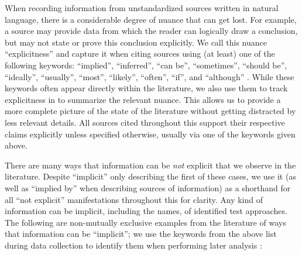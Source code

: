 When recording information from unstandardized sources written in natural
language, there is a considerable degree of nuance that can get lost. For
example, a source may provide data from which the reader can logically draw a
conclusion, but may not state or prove this conclusion explicitly.
We call this nuance ``explicitness'' and capture it when citing sources using
(at least) one of the following keywords: ``implied'', ``inferred'',
``can be'', ``sometimes'', ``should be'', ``ideally'', ``usually'', ``most'',
``likely'', ``often'', ``if'', and ``although''%
\utd{}. While these keywords often appear directly within the literature, we
also use them to track explicitness in \ourApproachGlossary{} to summarize the
relevant nuance. This allows us to provide a more complete picture of the state
of the literature without getting distracted by less relevant details. All
sources cited throughout this \docType{} support their
respective claims explicitly unless specified otherwise, usually via one of the
keywords given above.

There are many ways that
information can be \emph{not} explicit that we observe in the literature.
Despite ``implicit'' only describing the first of these cases, we use it
(as well as ``implied by'' when describing sources of information) as a
shorthand for all ``not explicit'' manifestations throughout this \docType{}
for clarity. Any kind of information can be implicit,
including the names, \approachFields{} of identified test approaches. The
following are non-mutually exclusive
examples from the literature of ways that information can be ``implicit'';
we use the keywords from the above list during data collection to identify
them when performing later analysis \impKeywordsCode{}:

